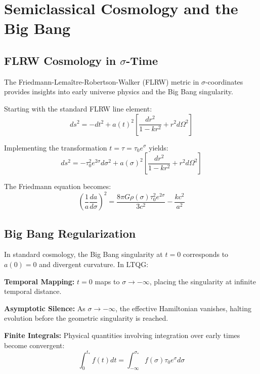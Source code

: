 \documentclass[12pt,a4paper]{article}
\begin{document}
\section{Semiclassical Cosmology and the Big Bang}

\subsection{FLRW Cosmology in $\sigma$-Time}

The Friedmann-Lemaître-Robertson-Walker (FLRW) metric in $\sigma$-coordinates provides insights into early universe physics and the Big Bang singularity.

Starting with the standard FLRW line element:
\begin{equation}
ds^2 = -dt^2 + a(t)^2 \left[\frac{dr^2}{1-kr^2} + r^2 d\Omega^2\right]
\end{equation}

Implementing the transformation $t = \tau = \tau_0 e^{\sigma}$ yields:
\begin{equation}
ds^2 = -\tau_0^2 e^{2\sigma} d\sigma^2 + a(\sigma)^2 \left[\frac{dr^2}{1-kr^2} + r^2 d\Omega^2\right]
\end{equation}

The Friedmann equation becomes:
\begin{equation}
\left(\frac{1}{a}\frac{da}{d\sigma}\right)^2 = \frac{8\pi G \rho(\sigma) \tau_0^2 e^{2\sigma}}{3c^2} - \frac{kc^2}{a^2}
\end{equation}

\subsection{Big Bang Regularization}

In standard cosmology, the Big Bang singularity at $t = 0$ corresponds to $a(0) = 0$ and divergent curvature. In LTQG:

\textbf{Temporal Mapping:} $t = 0$ maps to $\sigma \to -\infty$, placing the singularity at infinite temporal distance.

\textbf{Asymptotic Silence:} As $\sigma \to -\infty$, the effective Hamiltonian vanishes, halting evolution before the geometric singularity is reached.

\textbf{Finite Integrals:} Physical quantities involving integration over early times become convergent:
\begin{equation}
\int_0^{t_*} f(t) dt = \int_{-\infty}^{\sigma_*} f(\sigma) \tau_0 e^{\sigma} d\sigma
\end{equation}
\end{document}
